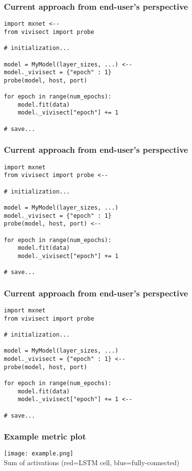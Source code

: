 \documentclass{beamer}
\begin{document}
\begin{frame}[fragile]
  \frametitle{Current approach from end-user's perspective}
\begin{lstlisting}[caption={Works for PyTorch and Tensorflow, too}]
import mxnet <--
from vivisect import probe
 
# initialization...
 
model = MyModel(layer_sizes, ...) <--
model._vivisect = {"epoch" : 1}
probe(model, host, port)
 
for epoch in range(num_epochs):
    model.fit(data)
    model._vivisect["epoch"] += 1
 
# save...
\end{lstlisting}
\end{frame}


\begin{frame}[fragile]
  \frametitle{Current approach from end-user's perspective}
\begin{lstlisting}[caption={Import one function}]
import mxnet
from vivisect import probe <--
 
# initialization...
 
model = MyModel(layer_sizes, ...)
model._vivisect = {"epoch" : 1}
probe(model, host, port) <--
 
for epoch in range(num_epochs):
    model.fit(data)
    model._vivisect["epoch"] += 1
 
# save...
\end{lstlisting}
\end{frame}


\begin{frame}[fragile]
  \frametitle{Current approach from end-user's perspective}
\begin{lstlisting}[caption={Arbitrary metadata for downstream}]
import mxnet
from vivisect import probe
 
# initialization...
 
model = MyModel(layer_sizes, ...)
model._vivisect = {"epoch" : 1} <--
probe(model, host, port)
 
for epoch in range(num_epochs):
    model.fit(data)
    model._vivisect["epoch"] += 1 <--
 
# save...
\end{lstlisting}
\end{frame}


\begin{frame}
  \centering
  \frametitle{Example metric plot}
  \texttt{[image: example.png]}\\
  Sum of activations (red=LSTM cell, blue=fully-connected)
\end{frame}
\end{document}
